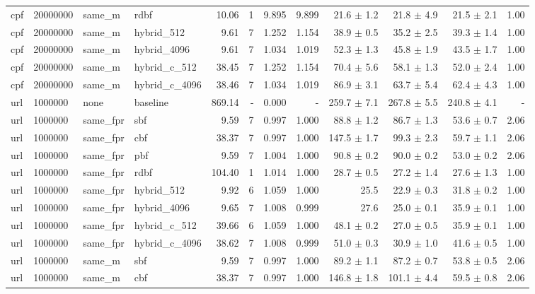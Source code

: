 \begin{tabular}{llllrrrrrrrr}
cpf & 20000000 & same\_m & rdbf & 10.06 & 1 & 9.895 & 9.899 & 21.6 $\pm$ 1.2 & 21.8 $\pm$ 4.9 & 21.5 $\pm$ 2.1 & 1.00 \\
cpf & 20000000 & same\_m & hybrid\_512 & 9.61 & 7 & 1.252 & 1.154 & 38.9 $\pm$ 0.5 & 35.2 $\pm$ 2.5 & 39.3 $\pm$ 1.4 & 1.00 \\
cpf & 20000000 & same\_m & hybrid\_4096 & 9.61 & 7 & 1.034 & 1.019 & 52.3 $\pm$ 1.3 & 45.8 $\pm$ 1.9 & 43.5 $\pm$ 1.7 & 1.00 \\
cpf & 20000000 & same\_m & hybrid\_c\_512 & 38.45 & 7 & 1.252 & 1.154 & 70.4 $\pm$ 5.6 & 58.1 $\pm$ 1.3 & 52.0 $\pm$ 2.4 & 1.00 \\
cpf & 20000000 & same\_m & hybrid\_c\_4096 & 38.46 & 7 & 1.034 & 1.019 & 86.9 $\pm$ 3.1 & 63.7 $\pm$ 5.4 & 62.4 $\pm$ 4.3 & 1.00 \\
url & 1000000 & none & baseline & 869.14 & - & 0.000 & - & 259.7 $\pm$ 7.1 & 267.8 $\pm$ 5.5 & 240.8 $\pm$ 4.1 & - \\
url & 1000000 & same\_fpr & sbf & 9.59 & 7 & 0.997 & 1.000 & 88.8 $\pm$ 1.2 & 86.7 $\pm$ 1.3 & 53.6 $\pm$ 0.7 & 2.06 \\
url & 1000000 & same\_fpr & cbf & 38.37 & 7 & 0.997 & 1.000 & 147.5 $\pm$ 1.7 & 99.3 $\pm$ 2.3 & 59.7 $\pm$ 1.1 & 2.06 \\
url & 1000000 & same\_fpr & pbf & 9.59 & 7 & 1.004 & 1.000 & 90.8 $\pm$ 0.2 & 90.0 $\pm$ 0.2 & 53.0 $\pm$ 0.2 & 2.06 \\
url & 1000000 & same\_fpr & rdbf & 104.40 & 1 & 1.014 & 1.000 & 28.7 $\pm$ 0.5 & 27.2 $\pm$ 1.4 & 27.6 $\pm$ 1.3 & 1.00 \\
url & 1000000 & same\_fpr & hybrid\_512 & 9.92 & 6 & 1.059 & 1.000 & 25.5 & 22.9 $\pm$ 0.3 & 31.8 $\pm$ 0.2 & 1.00 \\
url & 1000000 & same\_fpr & hybrid\_4096 & 9.65 & 7 & 1.008 & 0.999 & 27.6 & 25.0 $\pm$ 0.1 & 35.9 $\pm$ 0.1 & 1.00 \\
url & 1000000 & same\_fpr & hybrid\_c\_512 & 39.66 & 6 & 1.059 & 1.000 & 48.1 $\pm$ 0.2 & 27.0 $\pm$ 0.5 & 35.9 $\pm$ 0.1 & 1.00 \\
url & 1000000 & same\_fpr & hybrid\_c\_4096 & 38.62 & 7 & 1.008 & 0.999 & 51.0 $\pm$ 0.3 & 30.9 $\pm$ 1.0 & 41.6 $\pm$ 0.5 & 1.00 \\
url & 1000000 & same\_m & sbf & 9.59 & 7 & 0.997 & 1.000 & 89.2 $\pm$ 1.1 & 87.2 $\pm$ 0.7 & 53.8 $\pm$ 0.5 & 2.06 \\
url & 1000000 & same\_m & cbf & 38.37 & 7 & 0.997 & 1.000 & 146.8 $\pm$ 1.8 & 101.1 $\pm$ 4.4 & 59.5 $\pm$ 0.8 & 2.06 \\

\end{tabular}
